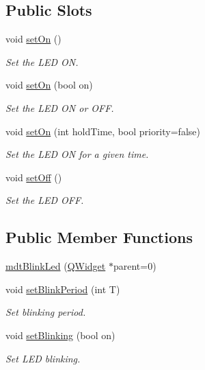 \subsection*{Public Slots}
\begin{DoxyCompactItemize}
\item 
void \hyperlink{classmdt_blink_led_ae51c54f31a11dbaebe69ab2c0b814d0f}{set\-On} ()
\begin{DoxyCompactList}\small\item\em Set the L\-E\-D O\-N. \end{DoxyCompactList}\item 
void \hyperlink{classmdt_blink_led_aae5bb31d3d9a428717771cd926aa1d33}{set\-On} (bool on)
\begin{DoxyCompactList}\small\item\em Set the L\-E\-D O\-N or O\-F\-F. \end{DoxyCompactList}\item 
void \hyperlink{classmdt_blink_led_aab370ebe5c53203947e49e794d0959a7}{set\-On} (int hold\-Time, bool priority=false)
\begin{DoxyCompactList}\small\item\em Set the L\-E\-D O\-N for a given time. \end{DoxyCompactList}\item 
void \hyperlink{classmdt_blink_led_a951465e8a9ae5167e7eb05a7107ab13f}{set\-Off} ()
\begin{DoxyCompactList}\small\item\em Set the L\-E\-D O\-F\-F. \end{DoxyCompactList}\end{DoxyCompactItemize}
\subsection*{Public Member Functions}
\begin{DoxyCompactItemize}
\item 
\hyperlink{classmdt_blink_led_abbc96bc408a45ceb191a908b2808a235}{mdt\-Blink\-Led} (\hyperlink{class_q_widget}{Q\-Widget} $\ast$parent=0)
\item 
void \hyperlink{classmdt_blink_led_ae2dc395378aed0705ff19db5096a1efc}{set\-Blink\-Period} (int T)
\begin{DoxyCompactList}\small\item\em Set blinking period. \end{DoxyCompactList}\item 
void \hyperlink{classmdt_blink_led_a1b15c8fafec0bc3aeb31ddf284ca7be2}{set\-Blinking} (bool on)
\begin{DoxyCompactList}\small\item\em Set L\-E\-D blinking. \end{DoxyCompactList}\end{DoxyCompactItemize}
